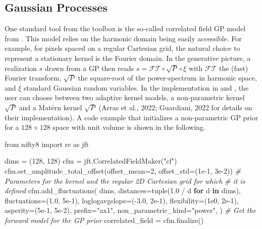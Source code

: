 \documentclass[10pt,a4paper,onecolumn]{article}
\let\textttOrig=\texttt
\def\texttt#1{\expandafter\textttOrig{\seqsplit{#1}}}
\newenvironment{Shaded}{}{}
\newcommand{\BuiltInTok}[1]{#1}
\newcommand{\CommentTok}[1]{\textcolor[rgb]{0.38,0.63,0.69}{\textit{#1}}}
\newcommand{\ControlFlowTok}[1]{\textcolor[rgb]{0.00,0.44,0.13}{\textbf{#1}}}
\newcommand{\DecValTok}[1]{\textcolor[rgb]{0.25,0.63,0.44}{#1}}
\newcommand{\FloatTok}[1]{\textcolor[rgb]{0.25,0.63,0.44}{#1}}
\newcommand{\ImportTok}[1]{#1}
\newcommand{\KeywordTok}[1]{\textcolor[rgb]{0.00,0.44,0.13}{\textbf{#1}}}
\newcommand{\NormalTok}[1]{#1}
\newcommand{\OperatorTok}[1]{\textcolor[rgb]{0.40,0.40,0.40}{#1}}
\newcommand{\StringTok}[1]{\textcolor[rgb]{0.25,0.44,0.63}{#1}}
\begin{document}
\hypertarget{gaussian-processes}{%
\subsection{Gaussian Processes}\label{gaussian-processes}}

One standard tool from the \texttt{NIFTy.re} toolbox is the so-called
correlated field GP model from \texttt{NIFTy}. This model relies on the
harmonic domain being easily accessible. For example, for pixels spaced
on a regular Cartesian grid, the natural choice to represent a
stationary kernel is the Fourier domain. In the generative picture, a
realization \(s\) drawn from a GP then reads
\(s = \mathcal{FT} \circ \sqrt{P} \circ \xi\) with \(\mathcal{FT}\) the
(fast) Fourier transform, \(\sqrt{P}\) the square-root of the
power-spectrum in harmonic space, and \(\xi\) standard Gaussian random
variables. In the implementation in \texttt{NIFTy.re} and
\texttt{NIFTy}, the user can choose between two adaptive kernel models,
a non-parametric kernel \(\sqrt{P}\) and a Matérn kernel \(\sqrt{P}\)
(Arras et al., 2022; Guardiani, 2022 for details on their
implementation). A code example that initializes a non-parametric GP
prior for a \(128 \times 128\) space with unit volume is shown in the
following.

\begin{Shaded}
\begin{Highlighting}[]
\ImportTok{from}\NormalTok{ nifty8 }\ImportTok{import}\NormalTok{ re }\ImportTok{as}\NormalTok{ jft}

\NormalTok{dims }\OperatorTok{=}\NormalTok{ (}\DecValTok{128}\NormalTok{, }\DecValTok{128}\NormalTok{)}
\NormalTok{cfm }\OperatorTok{=}\NormalTok{ jft.CorrelatedFieldMaker(}\StringTok{"cf"}\NormalTok{)}
\NormalTok{cfm.set\_amplitude\_total\_offset(offset\_mean}\OperatorTok{=}\DecValTok{2}\NormalTok{, offset\_std}\OperatorTok{=}\NormalTok{(}\FloatTok{1e{-}1}\NormalTok{, }\FloatTok{3e{-}2}\NormalTok{))}
\CommentTok{\# Parameters for the kernel and the regular 2D Cartesian grid for which}
\CommentTok{\# it is defined}
\NormalTok{cfm.add\_fluctuations(}
\NormalTok{  dims,}
\NormalTok{  distances}\OperatorTok{=}\BuiltInTok{tuple}\NormalTok{(}\FloatTok{1.0} \OperatorTok{/}\NormalTok{ d }\ControlFlowTok{for}\NormalTok{ d }\KeywordTok{in}\NormalTok{ dims),}
\NormalTok{  fluctuations}\OperatorTok{=}\NormalTok{(}\FloatTok{1.0}\NormalTok{, }\FloatTok{5e{-}1}\NormalTok{),}
\NormalTok{  loglogavgslope}\OperatorTok{=}\NormalTok{(}\OperatorTok{{-}}\FloatTok{3.0}\NormalTok{, }\FloatTok{2e{-}1}\NormalTok{),}
\NormalTok{  flexibility}\OperatorTok{=}\NormalTok{(}\FloatTok{1e0}\NormalTok{, }\FloatTok{2e{-}1}\NormalTok{),}
\NormalTok{  asperity}\OperatorTok{=}\NormalTok{(}\FloatTok{5e{-}1}\NormalTok{, }\FloatTok{5e{-}2}\NormalTok{),}
\NormalTok{  prefix}\OperatorTok{=}\StringTok{"ax1"}\NormalTok{,}
\NormalTok{  non\_parametric\_kind}\OperatorTok{=}\StringTok{"power"}\NormalTok{,}
\NormalTok{)}
\CommentTok{\# Get the forward model for the GP prior}
\NormalTok{correlated\_field }\OperatorTok{=}\NormalTok{ cfm.finalize()}
\end{Highlighting}
\end{Shaded}
\end{document}
